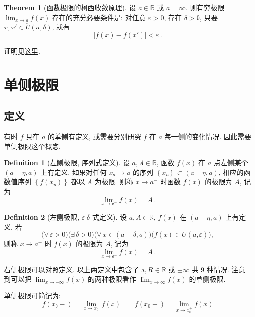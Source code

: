 \documentclass{book}
\newcommand{\Exists}{\exists\,}
\newcommand{\Any}{\forall\,}
\newcommand{\set}[1]{\left\{#1\right\}}
\newcommand{\exR}{\overline{\mathbb{R}}}
\newcommand{\abs}[1]{\left\lvert #1 \right\rvert}
\newcommand{\R}{\mathbb{R}}
\newcommand{\puncU}[1]{\check{U}\!\left( #1 \right)}
\renewcommand{\U}[1]{U\!\left( #1 \right)}%
\numberwithin{equation}{section}
\numberwithin{figure}{section}
\theoremstyle{definition}
\newtheorem{definition}{Definition}
\newtheorem{theorem}{Theorem}[section]
\begin{document}
\begin{theorem}[函数极限的柯西收敛原理]
  \leavevmode

  设 $a\in\exR$ 或 $a=\infty$. 则有穷极限 $\lim_{x\to a}f(x)$ 存在的充分必要条件是:
  对任意 $\varepsilon>0$, 存在 $\delta>0$, 只要 $x,x'\in\puncU{a,\delta}$, 就有
  \begin{equation*}
    \abs{f(x)-f(x')}<\varepsilon\,.
  \end{equation*}
  \label{the:FunctionLimitCauchy}
\end{theorem}
证明见\hyperlink{proof:FunctionLimitCauchy}{这里}.

\section{单侧极限}
\subsection{定义}
有时 $f$ 只在 $a$ 的单侧有定义, 或需要分别研究 $f$ 在 $a$ 每一侧的变化情况. 因此需要单侧极限这个概念.

\begin{definition}[左侧极限, 序列式定义]
  设 $a,A\in\exR$, 函数 $f(x)$ 在 $a$ 点左侧某个 $(a-\eta,a)$ 上有定义. 如果对任何 $x_n\to a$ 的序列 $\set{x_n}\subset(a-\eta,a)$, 相应的函数值序列 $\set{f(x_n)}$ 都以 $A$ 为极限. 则称 $x\to a^-$ 时函数 $f(x)$ 的极限为 $A$, 记为
  \begin{equation*}
    \lim_{x\to a^-}f(x)=A\,.
  \end{equation*}
\end{definition}

\begin{definition}[左侧极限, $\varepsilon$-$\delta$ 式定义]
  设 $a,A\in\exR$, $f(x)$ 在 $(a-\eta,a)$ 上有定义. 若
  \begin{equation*}
    \big(\Any \varepsilon>0\big)\big(\Exists \delta>0\big)\big( \Any x\in(a-\delta,a) \big)\big( f(x)\in\U{a,\varepsilon} \big),
  \end{equation*}
  则称 $x\to a^-$ 时 $f(x)$ 的极限为 $A$, 记为
  \begin{equation*}
    \lim_{x\to a^-}f(x)=A\,.
  \end{equation*}
\end{definition}
右侧极限可以对照定义.
以上两定义中包含了 $a,R\in\R$ 或 $\pm\infty$ 共 9 种情况. 注意到可以把 $\lim_{x\to \pm\infty}f(x)$ 的两种极限看作 $\lim_{x\to\infty}f(x)$ 的单侧极限.

单侧极限可简记为:
\begin{equation*}
  f(x_0-)=\lim_{x\to x_0^-}f(x)\qquad f(x_0+)=\lim_{x\to x_0^+}f(x)
\end{equation*}
\end{document}
